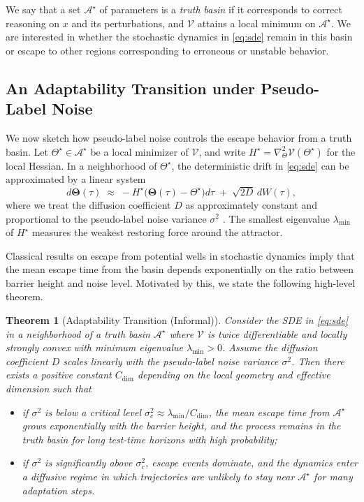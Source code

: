 \documentclass{article}
\theoremstyle{plain}
\newtheorem{theorem}{Theorem}[section]
\theoremstyle{definition}
\theoremstyle{remark}
\newcommand{\ThetaState}{\mathbf{\Theta}}  %
\newcommand{\Lyap}{\mathcal{V}}            %
\newcommand{\Attractor}{\mathcal{A}}       %
\newcommand{\Time}{\tau}                   %
\begin{document}
We say that a set $\Attractor^\star$ of parameters is a \emph{truth basin} if it corresponds to correct reasoning on $x$ and its perturbations, and $\Lyap$ attains a local minimum on $\Attractor^\star$. We are interested in whether the stochastic dynamics in \eqref{eq:sde} remain in this basin or escape to other regions corresponding to erroneous or unstable behavior.

\subsection{An Adaptability Transition under Pseudo-Label Noise}

We now sketch how pseudo-label noise controls the escape behavior from a truth basin. Let $\Theta^\star \in \Attractor^\star$ be a local minimizer of $\Lyap$, and write $H^\star = \nabla_{\Theta}^2 \Lyap(\Theta^\star)$ for the local Hessian. In a neighborhood of $\Theta^\star$, the deterministic drift in \eqref{eq:sde} can be approximated by a linear system
\begin{equation}
    d\ThetaState(\Time)
    \;\approx\;
    - H^\star \big( \ThetaState(\Time) - \Theta^\star \big) d\Time
    \;+\;
    \sqrt{2 D} \, dW(\Time),
\end{equation}
where we treat the diffusion coefficient $D$ as approximately constant and proportional to the pseudo-label noise variance $\sigma^2$ \cite{chen2024understanding,kumar2024consistency}. The smallest eigenvalue $\lambda_{\min}$ of $H^\star$ measures the weakest restoring force around the attractor.

Classical results on escape from potential wells in stochastic dynamics \cite{strogatz2018,oksendal2003stochastic,bahri2024statmech} imply that the mean escape time from the basin depends exponentially on the ratio between barrier height and noise level. Motivated by this, we state the following high-level theorem.

\begin{theorem}[Adaptability Transition (Informal)]
\label{thm:phase_transition}
Consider the SDE in \eqref{eq:sde} in a neighborhood of a truth basin $\Attractor^\star$ where $\Lyap$ is twice differentiable and locally strongly convex with minimum eigenvalue $\lambda_{\min}>0$. Assume the diffusion coefficient $D$ scales linearly with the pseudo-label noise variance $\sigma^2$. Then there exists a positive constant $C_{\mathrm{dim}}$ depending on the local geometry and effective dimension such that
\begin{itemize}
    \item if $\sigma^2$ is below a critical level $\sigma_c^2 \approx \lambda_{\min} / C_{\mathrm{dim}}$, the mean escape time from $\Attractor^\star$ grows exponentially with the barrier height, and the process remains in the truth basin for long test-time horizons with high probability;
    \item if $\sigma^2$ is significantly above $\sigma_c^2$, escape events dominate, and the dynamics enter a diffusive regime in which trajectories are unlikely to stay near $\Attractor^\star$ for many adaptation steps.
\end{itemize}
\end{theorem}
\end{document}
